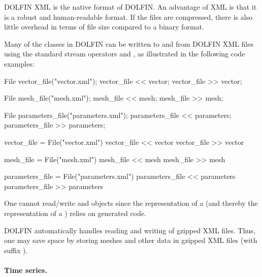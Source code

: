 DOLFIN XML is the native format of DOLFIN. An advantage of XML is that
it is a robust and human-readable format. If the files are compressed,
there is also little overhead in terms of file size compared to a
binary format.

Many of the classes in DOLFIN can be written to and from DOLFIN XML
files using the standard stream operators \emp{<{}<} and \emp{>{}>}, as
illustrated in the following code examples:
\begin{c++}
File vector_file("vector.xml");
vector_file << vector;
vector_file >> vector;

File mesh_file("mesh.xml");
mesh_file << mesh;
mesh_file >> mesh;

File parameters_file("parameters.xml");
parameters_file << parameters;
parameters_file >> parameters;
\end{c++}
\begin{python}
vector_file = File("vector.xml")
vector_file << vector
vector_file >> vector

mesh_file = File("mesh.xml")
mesh_file << mesh
mesh_file >> mesh

parameters_file = File("parameters.xml")
parameters_file << parameters
parameters_file >> parameters
\end{python}
One cannot read/write  and  objects
since the representation of a\break {} (and thereby the
representation of a ) relies on generated code.

DOLFIN automatically handles reading and writing of gzipped XML files. Thus,
one may save space by storing meshes and other data in gzipped XML files
(with suffix ).

\paragraph{Time series.}

